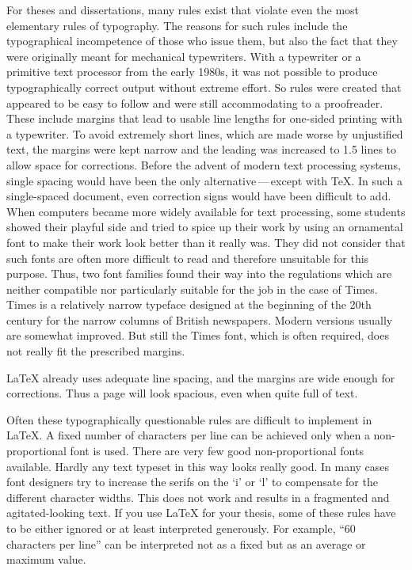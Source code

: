 For theses and dissertations, many rules exist that violate even the most
elementary rules of typography.
The reasons for such rules include the typographical incompetence of those who
issue them, but also the fact that they were originally meant for mechanical
typewriters. With a typewriter or a primitive text processor from the early
1980s, it was not possible to produce typographically correct output without
extreme effort. So rules were created that appeared to be easy to follow and
were still accommodating to a proofreader. These include margins that lead to
usable line lengths for one-sided printing with a typewriter. To avoid
extremely short lines, which are made worse by unjustified text, the margins
were kept narrow and the leading was increased to 1.5 lines to allow space for
corrections. Before the advent of modern text processing systems, single
spacing would have been the only alternative\,---\,except with \TeX. In such a
single-spaced document, even correction signs would have been difficult to
add. When computers became more widely available for text processing, some
students showed their playful side and tried to spice up their work by using
an ornamental font to make their work look better than it really was. They did
not consider that such fonts are often more difficult to read and therefore
unsuitable for this purpose. Thus, two font families found their way
into the regulations which are neither compatible nor particularly suitable
for the job in the case of Times. Times is a relatively narrow typeface
designed at the beginning of the 20th century for the narrow columns of
British newspapers. Modern versions usually are somewhat improved. But still
the Times font, which is often required, does not really fit the prescribed
margins.

{\LaTeX} already uses adequate line spacing, and the margins are wide enough
for corrections. Thus a page will look spacious, even when quite full of text.

Often these typographically questionable rules are difficult to implement in
{\LaTeX}. A fixed number of characters per line can be achieved only when a
non-proportional font is used. There are very few good non-proportional fonts
available. Hardly any text typeset in this way looks really good. In many
cases font designers try to increase the serifs on the `i' or `l' to
compensate for the different character widths. This does not work and results
in a fragmented and agitated-looking text. If you use {\LaTeX} for your
thesis, some of these rules have to be either ignored or at least interpreted
generously. For example, ``60 characters per line'' can be interpreted not as
a fixed but as an average or maximum value.%

